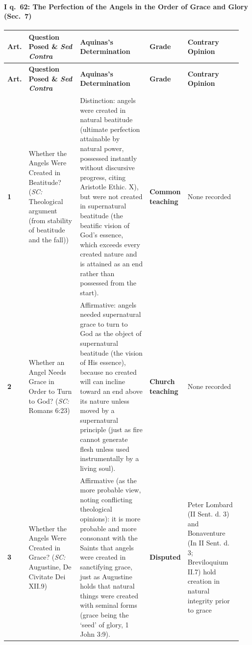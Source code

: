 \paragraph{I q.~62: The Perfection of the Angels in the Order of Grace and Glory (Sec.~7)}
{\scriptsize
\setlength{\tabcolsep}{2.5pt}
\renewcommand{\arraystretch}{1.15}
\begin{longtable}{>{\raggedright\arraybackslash}p{0.05\linewidth}>{\raggedright\arraybackslash}p{0.23\linewidth}>{\raggedright\arraybackslash}p{0.31\linewidth}>{\raggedright\arraybackslash}p{0.12\linewidth}>{\raggedright\arraybackslash}p{0.24\linewidth}}
\toprule
\textbf{Art.} & \textbf{Question Posed \& \emph{Sed Contra}} & \textbf{Aquinas's Determination} & \textbf{Grade} & \textbf{Contrary Opinion} \\
\midrule
\endfirsthead
\toprule
\textbf{Art.} & \textbf{Question Posed \& \emph{Sed Contra}} & \textbf{Aquinas's Determination} & \textbf{Grade} & \textbf{Contrary Opinion} \\
\midrule
\endhead
\bottomrule
\endfoot
\textbf{1} & Whether the Angels Were Created in Beatitude? (\emph{SC:} Theological argument (from stability of beatitude and the fall)) & Distinction: angels were created in natural beatitude (ultimate perfection attainable by natural power, possessed instantly without discursive progress, citing Aristotle Ethic. X), but were not created in supernatural beatitude (the beatific vision of God's essence, which exceeds every created nature and is attained as an end rather than possessed from the start). & \textbf{Common teaching} & None recorded \\
\addlinespace[1.5pt]
\textbf{2} & Whether an Angel Needs Grace in Order to Turn to God? (\emph{SC:} Romans 6:23) & Affirmative: angels needed supernatural grace to turn to God as the object of supernatural beatitude (the vision of His essence), because no created will can incline toward an end above its nature unless moved by a supernatural principle (just as fire cannot generate flesh unless used instrumentally by a living soul). & \textbf{Church teaching} & None recorded \\
\addlinespace[1.5pt]
\textbf{3} & Whether the Angels Were Created in Grace? (\emph{SC:} Augustine, De Civitate Dei XII.9) & Affirmative (as the more probable view, noting conflicting theological opinions): it is more probable and more consonant with the Saints that angels were created in sanctifying grace, just as Augustine holds that natural things were created with seminal forms (grace being the `seed' of glory, 1 John 3:9). & \textbf{Disputed} & Peter Lombard (II Sent. d. 3) and Bonaventure (In II Sent. d. 3; Breviloquium II.7) hold creation in natural integrity prior to grace \\

\end{longtable}}
